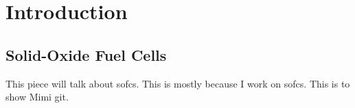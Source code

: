 


\chapter{Introduction}

\section{Solid-Oxide Fuel Cells}

This piece will talk about \glspl{sofc}.
This is mostly because I work on \glspl{sofc}.
This is to show Mimi git. 
\lipsum\cite{Wang2006a}

